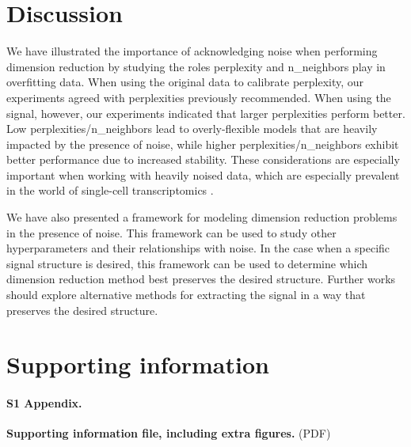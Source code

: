 \documentclass[10pt,letterpaper]{article}
\begin{document}
\section*{Discussion}
We have illustrated the importance of acknowledging noise when performing dimension reduction by studying the roles perplexity and n\_neighbors play in overfitting data. When using the original data to calibrate perplexity, our experiments agreed with perplexities previously recommended. When using the signal, however, our experiments indicated that larger perplexities perform better. Low perplexities/n\_neighbors lead to overly-flexible models that are heavily impacted by the presence of noise, while higher perplexities/n\_neighbors exhibit better performance due to increased stability. These considerations are especially important when working with heavily noised data, which are especially prevalent in the world of single-cell transcriptomics \cite{noise in single-cell data}.

We have also presented a framework for modeling dimension reduction problems in the presence of noise. This framework can be used to study other hyperparameters and their relationships with noise. In the case when a specific signal structure is desired, this framework can be used to determine which dimension reduction method best preserves the desired structure. Further works should explore alternative methods for extracting the signal in a way that preserves the desired structure.

\section*{Supporting information}

\paragraph*{S1 Appendix.}
\label{S1}
{{\bf Supporting information file, including extra figures.} (PDF)}

\nolinenumbers
\end{document}
